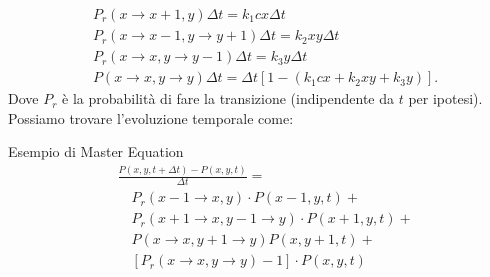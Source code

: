 \[\begin{aligned}
    &P_r(x\to x+1, y) \Delta t = k_1 c x \Delta t\\
    &P_r(x\to x-1, y \to y+1) \Delta t  = k_2xy\Delta t\\
    &P_r(x\to x,y\to y-1) \Delta t = k_3 y \Delta t\\
    &P(x\to x,y\to y) \Delta t = \Delta t \left[  1 - \left(k_1cx+ k_2xy + k_3 y\right)\right]
.\end{aligned}\]
Dove $P_r$ è la probabilità di fare la transizione (indipendente da $t$ per ipotesi).
Possiamo trovare l'evoluzione temporale come:
\begin{redbox}{Esempio di Master Equation}
    \begin{equation}
        \begin{aligned}
	    &\frac{P(x,y,t+\Delta  t) - P(x,y,t)}{\Delta  t}  =\\
	    & \quad P_r(x-1\to x, y) \cdot P(x-1,y,t) +\\
	    & \quad P_r(x+1\to x, y-1\to y) \cdot P(x+1,y,t) + \\
	    & \quad P(x\to x, y+1\to y) P(x,y+1,t) + \\
	    & \quad \left[P_r(x\to x, y\to y) - 1\right]\cdot P(x,y,t) 
        \end{aligned}
    \end{equation}
\end{redbox}
